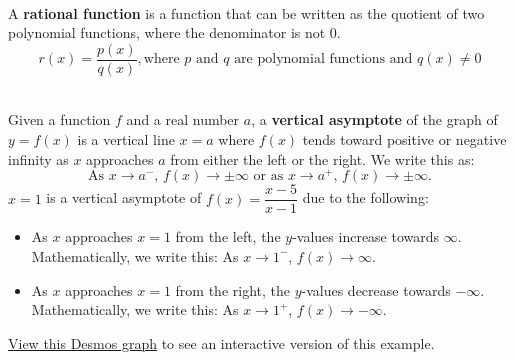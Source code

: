 \begin{myDefinition}~\\[0.5mm]
A {\bf rational function} is a function that can be written as the quotient of two polynomial functions, where the denominator is not 0.
$$r(x)=\dfrac{p(x)}{q(x)}, \text{where $p$ and $q$ are polynomial functions and $q(x)\neq0$}$$
\end{myDefinition}

\begin{myDefinition}~\\[0.5mm]
Given a function $f$ and a real number $a$, a {\bf vertical asymptote} of the graph of $y=f(x)$ is a vertical line $x=a$ where $f(x)$ tends toward positive or negative infinity as $x$ approaches $a$ from either the left or the right. We write this as:
$$\text{As $x\rightarrow a^{-}$, $f(x) \rightarrow \pm \infty$ or as $x\rightarrow a^{+}$, $f(x) \rightarrow \pm \infty$.}$$
 $x=1$ is a vertical asymptote of $f(x)=\dfrac{x-5}{x-1}$ due to the following:
\begin{itemize}
\item As $x$ approaches $x=1$ from the left, the $y$-values increase towards $\infty$.\\
Mathematically, we write this: As $x\rightarrow 1^{-}$, $f(x)\rightarrow\infty$.
\item As $x$ approaches $x=1$ from the right, the $y$-values decrease towards $-\infty$.\\
Mathematically, we write this: As $x\rightarrow 1^{+}$, $f(x)\rightarrow -\infty$.
\end{itemize}
\begin{minipage}{0.9\linewidth}
\href{https://tiny.cc/111Z-VertAsymp}{View this Desmos graph} to see an interactive version of this example.  %
\end{minipage}
\begin{minipage}{0.1\linewidth}
\flushright {}
\end{minipage}
\end{myDefinition}


